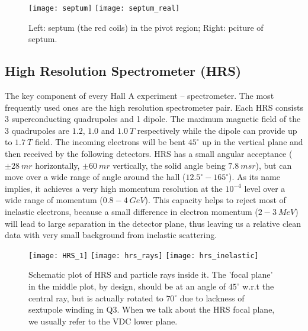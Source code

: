 \begin{figure}[h!]
    \texttt{[image: septum]}
    \texttt{[image: septum\_real]}
    \caption{Left: septum (the red coils) in the pivot region; 
    Right: pciture of septum.}
\end{figure}

\subsection{High Resolution Spectrometer (HRS)}
The key component of every Hall A experiment -- spectrometer. The most frequently
used ones are the high resolution spectrometer pair. Each HRS consists 3 superconducting
quadrupoles and 1 dipole. The maximum magnetic field of the 3 quadrupoles are
$1.2$, $1.0$ and $1.0\ T$ respectively while the dipole can provide up to $1.7\ T$ field. 
The incoming electrons will be bent $45^\circ$ up in the vertical plane and then
received by the following detectors.
HRS has a small angular acceptance ($\pm 28\ mr$ horizontally, $\pm 60\ mr$ vertically, 
the solid angle being $7.8\ msr$), but can move over a wide range of angle
around the hall ($12.5^\circ - 165^\circ$). As its name implies, it achieves a 
very high momentum resolution at the $10^{-4}$ level over a wide range of momentum 
($0.8 - 4\ GeV$). This capacity helps to reject most of inelastic electrons, 
because a small difference in electron momentum ($2-3\ MeV$) will lead to
large separation in the detector plane, thus leaving us a relative clean data 
with very small background from inelastic scattering. 

\begin{figure}[h!]
    \centering
    \texttt{[image: HRS\_1]}
    \texttt{[image: hrs\_rays]}
    \texttt{[image: hrs\_inelastic]}
    \caption{Schematic plot of HRS and particle rays inside it. \cite{halla3d}
    The 'focal plane' in the middle plot, by design, should be at an angle of $45^\circ$
    w.r.t the central ray, but is actually rotated to $70^\circ$ due to lackness
    of sextupole winding in Q3. When we talk about the HRS focal plane, we
    usually refer to the VDC lower plane.
    }
\end{figure}



